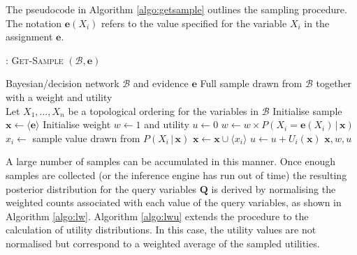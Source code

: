 The pseudocode in Algorithm \ref{algo:getsample} outlines the sampling procedure.  The notation $\mathbf{e}(X_i)$ refers to the value specified for the variable $X_i$ in the assignment $\mathbf{e}$. 


\begin{algorithm}[h!]
\caption{: \textsc{Get-Sample} $(\mathcal{B}, \mathbf{e})$}
\begin{algorithmic}[1] \vspace{2mm} 
\REQUIRE Bayesian/decision network $\mathcal{B}$  and evidence $\mathbf{e}$
\ENSURE Full sample drawn from $\mathcal{B}$ together with a weight and utility \\[2mm]
\STATE Let $X_1,\dots, X_n$ be a topological ordering for the variables in $\mathcal{B}$
\STATE Initialise sample $\mathbf{x} \leftarrow \langle \mathbf{e} \rangle$
\STATE Initialise weight $w \leftarrow 1$ and utility $u \leftarrow 0$
\STATE $w \leftarrow w \times P\left(X_i = \mathbf{e}(X_i)  \, | \,  \mathbf{x}\right)$
\STATE $x_i \leftarrow$ sample value drawn from $P(X_i  \, | \,  \mathbf{x})$
\STATE $\mathbf{x} \leftarrow \mathbf{x} \cup \langle x_i \rangle$
\STATE $u \leftarrow u + U_i(\mathbf{x})$
\ENDIF
\ENDFOR
\RETURN $\mathbf{x}, w, u$
\end{algorithmic}
\label{algo:getsample}
\end{algorithm}

A large number of samples can be accumulated in this manner. Once enough samples are collected (or the inference engine has run out of time) the resulting posterior distribution for the query variables $\mathbf{Q}$ is derived by normalising the weighted counts associated with each value of the query variables, as shown in Algorithm \ref{algo:lw}. Algorithm \ref{algo:lwu} extends the procedure to the calculation of utility distributions. In this case, the utility values are not normalised but correspond to a weighted average of the sampled utilities. 

